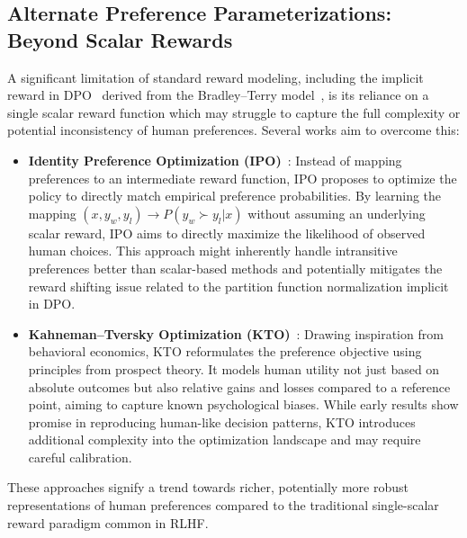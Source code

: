 \documentclass[a4paper,oneside,10pt,ngerman,english]{scrartcl}
\begin{document}
\subsection{Alternate Preference Parameterizations: Beyond Scalar Rewards}
A significant limitation of standard reward modeling, including the implicit reward in DPO~\cite{bib:Rafailov2023} derived from the Bradley--Terry model~\cite{bib:bradley1952rank}, is its reliance on a single scalar reward function which may struggle to capture the full complexity or potential inconsistency of human preferences. Several works aim to overcome this:
\begin{itemize}
    \item \textbf{Identity Preference Optimization (IPO)}~\cite{bib:azar2023ipo}: Instead of mapping preferences to an intermediate reward function, IPO proposes to optimize the policy to directly match empirical preference probabilities. By learning the mapping \( (x, y_w, y_l) \rightarrow P(y_w \succ y_l | x) \) without assuming an underlying scalar reward, IPO aims to directly maximize the likelihood of observed human choices. This approach might inherently handle intransitive preferences better than scalar-based methods and potentially mitigates the reward shifting issue related to the partition function normalization implicit in DPO.
    \item \textbf{Kahneman--Tversky Optimization (KTO)}~\cite{bib:ethayarajh2024kto}: Drawing inspiration from behavioral economics, KTO reformulates the preference objective using principles from prospect theory. It models human utility not just based on absolute outcomes but also relative gains and losses compared to a reference point, aiming to capture known psychological biases. While early results show promise in reproducing human-like decision patterns, KTO introduces additional complexity into the optimization landscape and may require careful calibration.
\end{itemize}
These approaches signify a trend towards richer, potentially more robust representations of human preferences compared to the traditional single-scalar reward paradigm common in RLHF.
\end{document}
